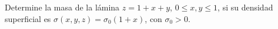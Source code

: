 Determine la masa de la lámina $z=1+x+y$, $0\leq x,y\leq1$, si su densidad superficial es $\sigma(x,y,z)=\sigma_0(1+x)$, con $\sigma_0>0$.
